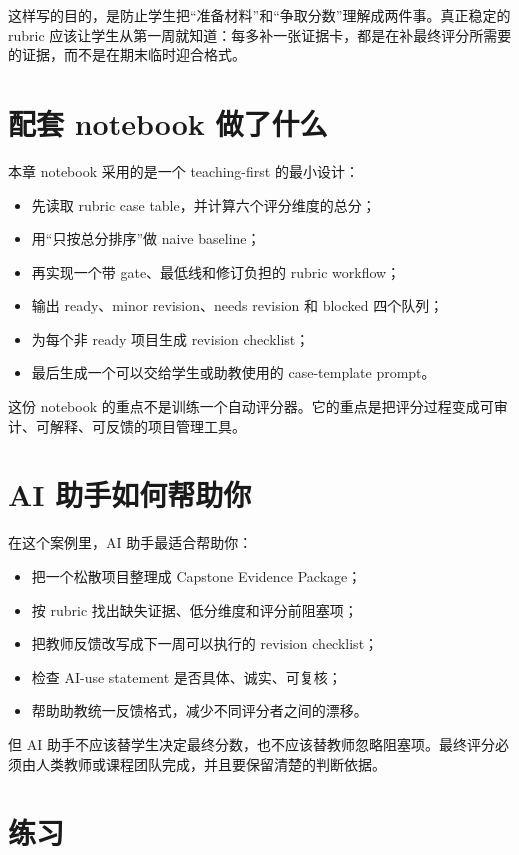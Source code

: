 这样写的目的，是防止学生把“准备材料”和“争取分数”理解成两件事。真正稳定的 rubric 应该让学生从第一周就知道：每多补一张证据卡，都是在补最终评分所需要的证据，而不是在期末临时迎合格式。

\section{配套 notebook 做了什么}

本章 notebook 采用的是一个 teaching-first 的最小设计：

\begin{itemize}
    \item 先读取 rubric case table，并计算六个评分维度的总分；
    \item 用“只按总分排序”做 naive baseline；
    \item 再实现一个带 gate、最低线和修订负担的 rubric workflow；
    \item 输出 ready、minor revision、needs revision 和 blocked 四个队列；
    \item 为每个非 ready 项目生成 revision checklist；
    \item 最后生成一个可以交给学生或助教使用的 case-template prompt。
\end{itemize}

这份 notebook 的重点不是训练一个自动评分器。它的重点是把评分过程变成可审计、可解释、可反馈的项目管理工具。

\section{AI 助手如何帮助你}

在这个案例里，AI 助手最适合帮助你：

\begin{itemize}
    \item 把一个松散项目整理成 Capstone Evidence Package；
    \item 按 rubric 找出缺失证据、低分维度和评分前阻塞项；
    \item 把教师反馈改写成下一周可以执行的 revision checklist；
    \item 检查 AI-use statement 是否具体、诚实、可复核；
    \item 帮助助教统一反馈格式，减少不同评分者之间的漂移。
\end{itemize}

但 AI 助手不应该替学生决定最终分数，也不应该替教师忽略阻塞项。最终评分必须由人类教师或课程团队完成，并且要保留清楚的判断依据。

\section{练习}

